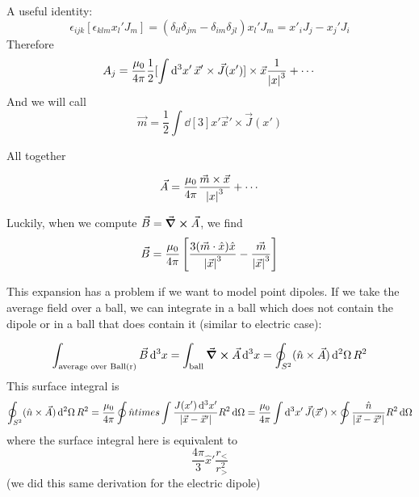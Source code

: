 \documentclass[a4paper,twoside,master.tex]{subfiles}
\begin{document}
A useful identity:
\begin{equation}
    \epsilon_{ijk} [\epsilon_{klm} x_l' J_m]= (\delta_{il} \delta_{jm} - \delta_{im} \delta_{jl})x_l' J_m = x'_iJ_j - x_j' J_i
\end{equation}
Therefore
\begin{equation}
    A_j = \frac{\mu_0}{4 \pi} \frac{1}{2} [ \int \dd[3]{x'} \vec{x}' \times \vec{J}(x') ] \times  \vec{x} \frac{1}{\abs{x}^3} + \cdots
\end{equation}
And we will call
\begin{equation}
    \vec{m} = \frac{1}{2} \int \dd[3]{x'} \vec{x}' \times \vec{J}(x')
\end{equation}

All together

\begin{equation}
    \vec{A} = \frac{\mu_0}{4 \pi} \frac{ \vec{m} \times \vec{x}}{\abs{x}^3} + \cdots
\end{equation}

Luckily, when we compute $ \vec{B} = \curl{ \vec{A}} $, we find
\begin{equation}
    \vec{B} = \frac{\mu_0}{4 \pi} \left[ \frac{3( \vec{m} \cdot \hat{x} ) \hat{x}}{\abs{ \vec{x}}^3} - \frac{ \vec{m}}{\abs{ \vec{x}}^3} \right]
\end{equation}


This expansion has a problem if we want to model point dipoles. If we take the average field over a ball, we can integrate in a ball which does not contain the dipole or in a ball that does contain it (similar to electric case):

\begin{equation}
    \int_{\text{average over Ball(r)}}  \vec{B} \dd[3]{x} =\int_{\text{ball}} \curl{ \vec{A}} \dd[3]{x} = \oint_{S^2} ( \hat{n} \times \vec{A}) \dd[2]{\Omega} R^2
\end{equation}
This surface integral is
\begin{equation}
    \oint_{S^2} ( \hat{n} \times \vec{A}) \dd[2]{\Omega} R^2 = \frac{\mu_0}{4 \pi}\oint \hat{n} times \int \frac{J(x') \dd[3]{x'}}{\abs{ \vec{x} - \vec{x}'}} R^2 \dd{\Omega} = \frac{\mu_0}{4 \pi} \int \dd[3]{x'} \vec{J}( \vec{x}') \times \oint \frac{ \hat{n}}{\abs{ \vec{x} - \vec{x}'}} R^2 \dd{\Omega}
\end{equation}
where the surface integral here is equivalent to
\begin{equation}
    \frac{4 \pi}{3} \hat{x}' \frac{r_<}{r_>^2}
\end{equation}
(we did this same derivation for the electric dipole)
\end{document}
